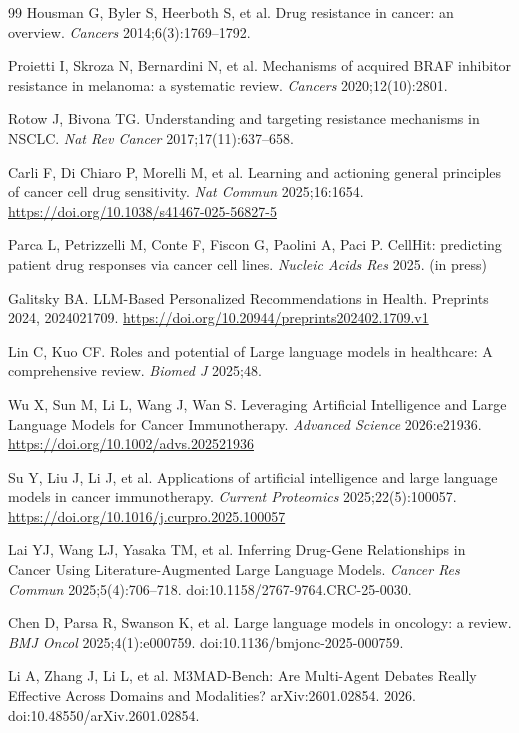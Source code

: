 \documentclass[11pt,letterpaper]{article}
\begin{document}
\begin{thebibliography}{99}
Housman G, Byler S, Heerboth S, et al.
Drug resistance in cancer: an overview.
\textit{Cancers} 2014;6(3):1769--1792.

Proietti I, Skroza N, Bernardini N, et al.
Mechanisms of acquired BRAF inhibitor resistance in melanoma: a systematic review.
\textit{Cancers} 2020;12(10):2801.

Rotow J, Bivona TG.
Understanding and targeting resistance mechanisms in NSCLC.
\textit{Nat Rev Cancer} 2017;17(11):637--658.

Carli F, Di Chiaro P, Morelli M, et al.
Learning and actioning general principles of cancer cell drug sensitivity.
\textit{Nat Commun} 2025;16:1654.
\url{https://doi.org/10.1038/s41467-025-56827-5}

Parca L, Petrizzelli M, Conte F, Fiscon G, Paolini A, Paci P.
CellHit: predicting patient drug responses via cancer cell lines.
\textit{Nucleic Acids Res} 2025. (in press)


Galitsky BA.
LLM-Based Personalized Recommendations in Health.
Preprints 2024, 2024021709.
\url{https://doi.org/10.20944/preprints202402.1709.v1}

Lin C, Kuo CF.
Roles and potential of Large language models in healthcare: A comprehensive review.
\textit{Biomed J} 2025;48.

Wu X, Sun M, Li L, Wang J, Wan S.
Leveraging Artificial Intelligence and Large Language Models for Cancer Immunotherapy.
\textit{Advanced Science} 2026:e21936.
\url{https://doi.org/10.1002/advs.202521936}

Su Y, Liu J, Li J, et al.
Applications of artificial intelligence and large language models in cancer immunotherapy.
\textit{Current Proteomics} 2025;22(5):100057.
\url{https://doi.org/10.1016/j.curpro.2025.100057}

Lai YJ, Wang LJ, Yasaka TM, et al.
Inferring Drug-Gene Relationships in Cancer Using Literature-Augmented Large Language Models.
\textit{Cancer Res Commun} 2025;5(4):706--718.
doi:10.1158/2767-9764.CRC-25-0030.

Chen D, Parsa R, Swanson K, et al.
Large language models in oncology: a review.
\textit{BMJ Oncol} 2025;4(1):e000759.
doi:10.1136/bmjonc-2025-000759.

Li A, Zhang J, Li L, et al.
M3MAD-Bench: Are Multi-Agent Debates Really Effective Across Domains and Modalities?
arXiv:2601.02854. 2026.
doi:10.48550/arXiv.2601.02854.


\end{thebibliography}
\end{document}
